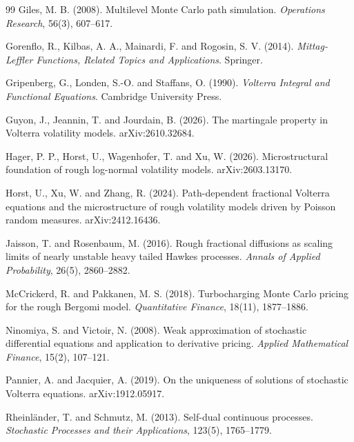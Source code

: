 \documentclass[11pt,a4paper]{article}
\theoremstyle{definition}
\begin{document}
\begin{thebibliography}{99}
Giles, M. B. (2008). Multilevel Monte Carlo path simulation. \emph{Operations Research}, 56(3), 607--617.

Gorenflo, R., Kilbas, A. A., Mainardi, F. and Rogosin, S. V. (2014). \emph{Mittag-Leffler Functions, Related Topics and Applications}. Springer.

Gripenberg, G., Londen, S.-O. and Staffans, O. (1990). \emph{Volterra Integral and Functional Equations}. Cambridge University Press.

Guyon, J., Jeannin, T. and Jourdain, B. (2026). The martingale property in Volterra volatility models. arXiv:2610.32684.

Hager, P. P., Horst, U., Wagenhofer, T. and Xu, W. (2026). Microstructural foundation of rough log-normal volatility models. arXiv:2603.13170.

Horst, U., Xu, W. and Zhang, R. (2024). Path-dependent fractional Volterra equations and the microstructure of rough volatility models driven by Poisson random measures. arXiv:2412.16436.

Jaisson, T. and Rosenbaum, M. (2016). Rough fractional diffusions as scaling limits of nearly unstable heavy tailed Hawkes processes. \emph{Annals of Applied Probability}, 26(5), 2860--2882.

McCrickerd, R. and Pakkanen, M. S. (2018). Turbocharging Monte Carlo pricing for the rough Bergomi model. \emph{Quantitative Finance}, 18(11), 1877--1886.

Ninomiya, S. and Victoir, N. (2008). Weak approximation of stochastic differential equations and application to derivative pricing. \emph{Applied Mathematical Finance}, 15(2), 107--121.

Pannier, A. and Jacquier, A. (2019). On the uniqueness of solutions of stochastic Volterra equations. arXiv:1912.05917.

Rheinl\"ander, T. and Schmutz, M. (2013). Self-dual continuous processes. \emph{Stochastic Processes and their Applications}, 123(5), 1765--1779.


\end{thebibliography}
\end{document}
